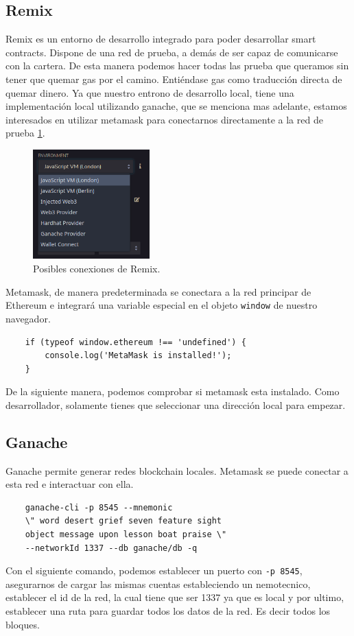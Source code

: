 \subsection{Remix}
Remix es un entorno de desarrollo integrado para poder desarrollar smart contracts. Dispone de una red de prueba, a demás de ser capaz de comunicarse con la cartera. De esta manera podemos hacer todas las prueba que queramos sin tener que quemar gas por el camino. Entiéndase gas como traducción directa de quemar dinero.
Ya que nuestro entrono de desarrollo local, tiene una implementación local utilizando ganache, que se menciona mas adelante, estamos interesados en utilizar metamask para conectarnos directamente a la red de prueba \ref{fg:remix}.
\begin{figure}[h!]
    \centering
    \includegraphics[width=0.4\textwidth]{Figures/remix.png}
    \caption{Posibles conexiones de Remix.}
    \label{fg:remix}
\end{figure}
Metamask, de manera predeterminada se conectara a la red principar de Ethereum e integrará una variable especial en el objeto \verb|window| de nuestro navegador.
\begin{lstlisting}
    if (typeof window.ethereum !== 'undefined') {
        console.log('MetaMask is installed!');
    }
\end{lstlisting}
De la siguiente manera, podemos comprobar si metamask esta instalado.
Como desarrollador, solamente tienes que seleccionar una dirección local para empezar.
\subsection{Ganache}
Ganache permite generar redes blockchain locales. Metamask se puede conectar a esta red e interactuar con ella.
\begin{lstlisting}
    ganache-cli -p 8545 --mnemonic 
    \" word desert grief seven feature sight 
    object message upon lesson boat praise \" 
    --networkId 1337 --db ganache/db -q
\end{lstlisting}
Con el siguiente comando, podemos establecer un puerto con \verb|-p 8545|, asegurarnos de cargar las mismas cuentas estableciendo un nemotecnico, establecer el id de la red, la cual tiene que ser 1337 ya que es local y por ultimo, establecer una ruta para guardar todos los datos de la red. Es decir todos los bloques.
